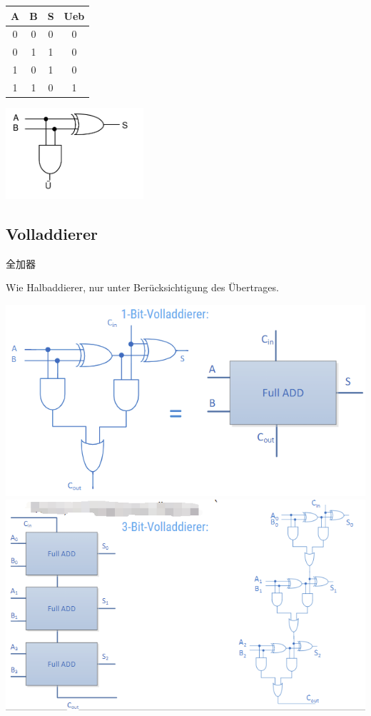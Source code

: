 \documentclass[fleqn]{article}
\begin{document}
\begin{center}
    \begin{tabular}{|c|c|c|c|}
        \hline
        A&B&S&Ueb\\
        \hline
        0&0&0&0\\
        0&1&1&0\\
        1&0&1&0\\
        1&1&0&1\\
        \hline
    \end{tabular}
\end{center}
\begin{center}
    \includegraphics[scale=0.6]{4.png}
\end{center}

\subsection{Volladdierer} 全加器

Wie Halbaddierer, nur unter Berücksichtigung des Übertrages.

\begin{center}
    \includegraphics[scale=0.6]{5.png}
    \includegraphics[scale=0.6]{10.png}
\end{center}
\end{document}
